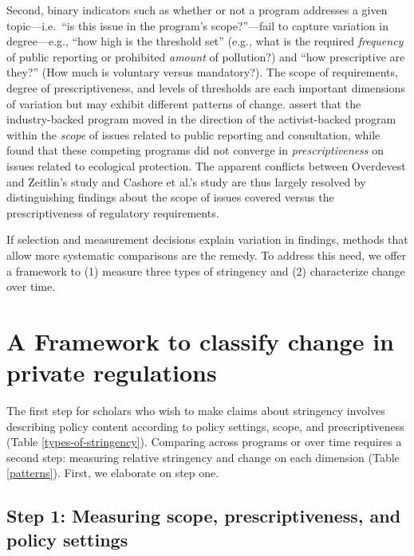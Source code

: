 \documentclass[
      12pt,
            Review ]{article}
\begin{document}
Second, binary indicators such as whether or not a program addresses a given topic---i.e.~``is this issue in the program's scope?''---fail to capture variation in degree---e.g., ``how high is the threshold set'' (e.g., what is the required \emph{frequency} of public reporting or prohibited \emph{amount} of pollution?) and ``how prescriptive are they?'' (How much is voluntary versus mandatory?). The scope of requirements, degree of prescriptiveness, and levels of thresholds are each important dimensions of variation but may exhibit different patterns of change. \citet{Overdevest2014} assert that the industry-backed program moved in the direction of the activist-backed program within the \emph{scope} of issues related to public reporting and consultation, while \citet{Cashore2004} found that these competing programs did not converge in \emph{prescriptiveness} on issues related to ecological protection. The apparent conflicts between Overdevest and Zeitlin's study and Cashore et al.'s study are thus largely resolved by distinguishing findings about the scope of issues covered versus the prescriptiveness of regulatory requirements.

If selection and measurement decisions explain variation in findings, methods that allow more systematic comparisons are the remedy. To address this need, we offer a framework to (1) measure three types of stringency and (2) characterize change over time.

\hypertarget{a-framework-to-classify-change-in-private-regulations}{%
\section{A Framework to classify change in private regulations}\label{a-framework-to-classify-change-in-private-regulations}}

The first step for scholars who wish to make claims about stringency involves describing policy content according to policy settings, scope, and prescriptiveness (Table \ref{types-of-stringency}). Comparing across programs or over time requires a second step: measuring relative stringency and change on each dimension (Table \ref{patterns}). First, we elaborate on step one.

\hypertarget{step-1-measuring-scope-prescriptiveness-and-policy-settings}{%
\subsection{Step 1: Measuring scope, prescriptiveness, and policy settings}\label{step-1-measuring-scope-prescriptiveness-and-policy-settings}}
\end{document}
